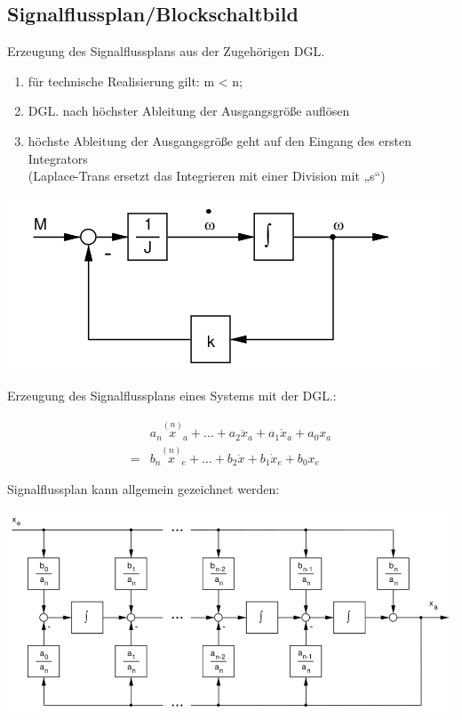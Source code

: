 \documentclass[10pt,a4paper]{article}
\begin{document}
\subsection{Signalflussplan/Blockschaltbild}
Erzeugung des Signalflussplans aus der Zugehörigen DGL.
\begin{mdframed}[style=exercise]
	\begin{enumerate}
		\item für technische Realisierung gilt: m < n;

		\item DGL. nach höchster Ableitung der Ausgangsgröße auflösen

		\item höchste Ableitung der Ausgangsgröße geht auf den Eingang des ersten Integrators\\
		      \footnotesize
		      (Laplace-Trans ersetzt das Integrieren mit einer Division mit „s“)
	\end{enumerate}
\end{mdframed}
\begin{center}
	\includegraphics[width=0.96\columnwidth]{Figures/Signalflussplan12.png}
\end{center}

Erzeugung des Signalflussplans eines Systems mit der DGL.:

\begin{align*}
	  & a_{n} \overset{(n)}{x}_{a}+\ldots+a_{2} \ddot{x}_{a}+a_{1} \dot{x}_{a}+a_{0} x_{a} \\
	= & b_{n} \overset{(n)}{x}_{e}+\ldots+b_{2} \ddot{x}+b_{1} \dot{x}_{e}+b_{0} x_{e}
\end{align*}

Signalflussplan kann allgemein gezeichnet werden:

\includegraphics[width=0.9\columnwidth]{Figures/SFmitDGL.png}
\end{document}
